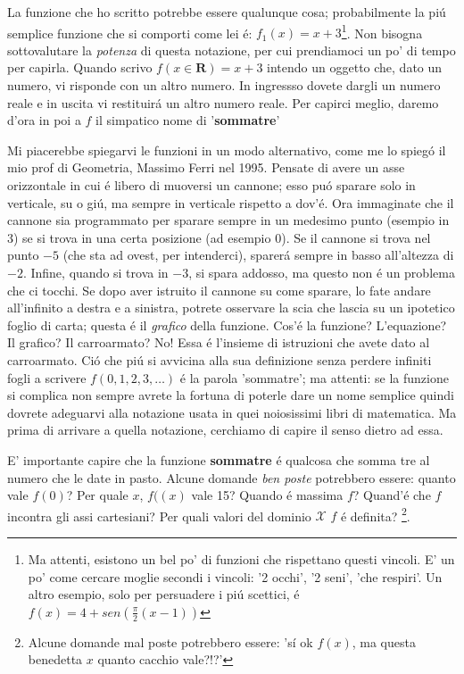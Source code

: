 La funzione che ho scritto potrebbe essere qualunque cosa; probabilmente la pi\'u
semplice funzione che si comporti come lei \'e: $f_1(x)=x+3$\footnote{Ma attenti,
esistono un bel po' di funzioni che rispettano questi vincoli. E' un po' come cercare
moglie secondi i vincoli: '2 occhi', '2 seni', 'che respiri'. Un altro esempio, solo per persuadere
i pi\'u scettici, \'e $f(x)=4+sen(\frac{\pi}{2}(x-1))$}. Non bisogna sottovalutare 
la \emph{potenza} di questa notazione, per cui prendiamoci un po' di tempo per 
capirla. Quando scrivo $f(x \in \mathbf{R})=x+3$ intendo un oggetto che, dato un numero, 
vi risponde con un altro numero. In ingressso dovete dargli un numero reale e in uscita 
vi restituir\'a un altro numero reale. Per capirci meglio, daremo d'ora in poi a $f$ il 
simpatico nome di '{\bf sommatre}'

Mi piacerebbe spiegarvi le funzioni in un modo alternativo, come me lo spieg\'o il mio prof
di Geometria, Massimo Ferri nel 1995. Pensate di avere un asse orizzontale in cui \'e libero di muoversi un cannone;
esso pu\'o sparare solo in verticale, su o gi\'u, ma sempre in verticale rispetto a dov'\'e. Ora
immaginate che il cannone sia programmato per sparare sempre in un medesimo punto (esempio in $3$)
se si trova in una certa posizione (ad esempio $0$). Se il cannone si trova nel punto $-5$ (che sta
ad ovest, per intenderci), sparer\'a sempre in basso all'altezza di $-2$. Infine, quando si trova
in $-3$, si spara addosso, ma questo non \'e un problema che ci tocchi. Se dopo aver istruito il
cannone su come sparare, lo fate andare all'infinito a destra e a sinistra, potrete osservare la scia
che lascia su un ipotetico foglio di carta; questa \'e il {\em grafico} della funzione. Cos'\'e la 
funzione? L'equazione? Il grafico? Il carroarmato? No! Essa \'e l'insieme di istruzioni che avete dato al carroarmato.
Ci\'o che pi\'u si avvicina alla sua definizione senza perdere infiniti fogli a scrivere $f(0,1,2,3,\ldots)$ \'e
la parola 'sommatre'; ma attenti: se la funzione si complica non sempre avrete la fortuna di poterle dare un nome semplice
quindi dovrete adeguarvi alla notazione usata in quei noiosissimi libri di matematica. Ma prima di arrivare a quella notazione,
cerchiamo di capire il senso dietro ad essa.

E' importante capire che la funzione {\bf sommatre} \'e qualcosa che somma tre al numero 
che le date in pasto. Alcune domande {\em ben poste} potrebbero essere: quanto vale $f(0)$? Per quale
 $x$, $f((x)$ vale 15? Quando \'e massima $f$? Quand'\'e che $f$ incontra gli assi cartesiani? 
 Per quali valori del dominio $\mathcal{X}$  $f$ \'e definita? 
 \footnote{Alcune domande mal poste potrebbero essere: 's\'i ok $f(x)$, ma questa benedetta $x$ quanto cacchio vale?!?'}.
 
